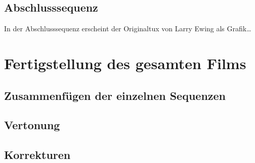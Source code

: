 \documentclass[11pt,parskip]{scrartcl}
\begin{document}
\subsection{Abschlusssequenz}
In der Abschlusssequenz erscheint der Originaltux von Larry Ewing als
Grafik\ldots


\newpage

\section{Fertigstellung des gesamten Films}


\subsection{Zusammenfügen der einzelnen Sequenzen}


\subsection{Vertonung}


\subsection{Korrekturen}


\newpage
{}


\end{document}
